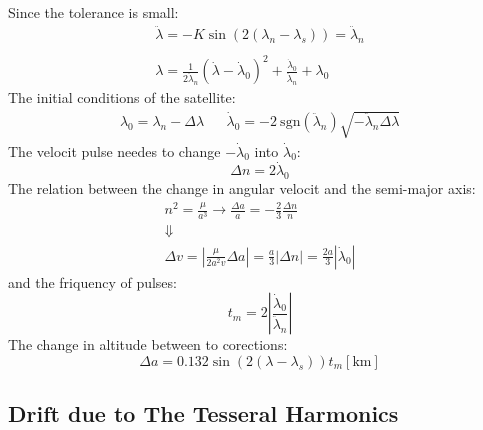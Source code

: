 \documentclass[12pt, a4paper]{article}
\begin{document}
Since the tolerance is small:
\begin{equation}
    \begin{array}{c}
        \ddot{\lambda}=-K\sin\left(2\left(\lambda_n-\lambda_s\right)\right)=\ddot{\lambda}_n \\\\
        \lambda=\displaystyle\frac{1}{2\ddot{\lambda}_n}\left(\dot{\lambda}-\dot{\lambda}_0\right)^2+\frac{\dot{\lambda}_0}{\ddot{\lambda}_n}+\lambda_0
    \end{array}
\end{equation}
The initial conditions of the satellite:
\begin{equation}
    \begin{matrix}
        \lambda_0=\lambda_n-\Delta\lambda && \dot{\lambda}_0=-2\mathrm{\ sgn}\left(\ddot{\lambda}_n\right)\sqrt{-\ddot{\lambda}_n\Delta\lambda}
    \end{matrix}
\end{equation}
The velocit pulse needes to change $-\dot{\lambda}_0$ into $\dot{\lambda}_0$:
\begin{equation}
    \Delta n=2\dot{\lambda}_0
\end{equation}
The relation between the change in angular velocit and the semi-major axis:
\begin{equation}
    \begin{array}{c}
        \displaystyle n^2=\frac{\mu}{a^3}\rightarrow\frac{\Delta a}{a}=-\frac{2}{3}\frac{\Delta n}{n} \\
        \Downarrow \\
        \displaystyle \Delta v=\left|\frac{\mu}{2a^2v}\Delta a\right|=\frac{a}{3}\left|\Delta n\right|=\frac{2a}{3}\left|\dot{\lambda}_0\right|
    \end{array}
\end{equation}
and the friquency of pulses:
\begin{equation}
    t_m=2\left|\frac{\dot{\lambda}_0}{\ddot{\lambda}_n}\right|
\end{equation}
The change in altitude between to corections:
\begin{equation}
    \Delta a=0.132\sin\left(2\left(\lambda-\lambda_s\right)\right)t_m\left[\mathrm{km}\right]
\end{equation}

\subsection{Drift due to The Tesseral Harmonics}
\end{document}
